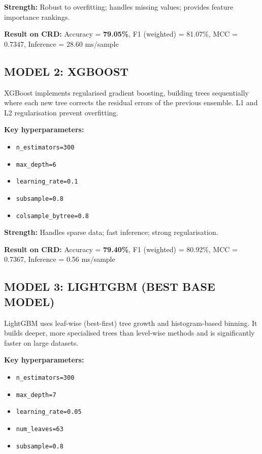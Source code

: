 \documentclass[12pt,a4paper,oneside]{report}
\begin{document}
\textbf{Strength:} Robust to overfitting; handles missing values; provides feature importance rankings.

\textbf{Result on CRD:} Accuracy = \textbf{79.05\%}, F1 (weighted) = 81.07\%, MCC = 0.7347, Inference = 28.60 ms/sample

\subsection{MODEL 2: XGBOOST}
XGBoost implements regularised gradient boosting, building trees sequentially where each new tree corrects the residual errors of the previous ensemble. L1 and L2 regularisation prevent overfitting.

\textbf{Key hyperparameters:}
\begin{singlespacing}
\begin{itemize}[leftmargin=2cm, label={}, itemsep=0pt]
  \item \texttt{n\_estimators=300}
  \item \texttt{max\_depth=6}
  \item \texttt{learning\_rate=0.1}
  \item \texttt{subsample=0.8}
  \item \texttt{colsample\_bytree=0.8}
\end{itemize}
\end{singlespacing}

\textbf{Strength:} Handles sparse data; fast inference; strong regularisation.

\textbf{Result on CRD:} Accuracy = \textbf{79.40\%}, F1 (weighted) = 80.92\%, MCC = 0.7367, Inference = 0.56 ms/sample

\subsection{MODEL 3: LIGHTGBM (BEST BASE MODEL)}
LightGBM uses leaf-wise (best-first) tree growth and histogram-based binning. It builds deeper, more specialised trees than level-wise methods and is significantly faster on large datasets.

\textbf{Key hyperparameters:}
\begin{singlespacing}
\begin{itemize}[leftmargin=2cm, label={}, itemsep=0pt]
  \item \texttt{n\_estimators=300}
  \item \texttt{max\_depth=7}
  \item \texttt{learning\_rate=0.05}
  \item \texttt{num\_leaves=63}
  \item \texttt{subsample=0.8}
\end{itemize}
\end{singlespacing}
\end{document}
